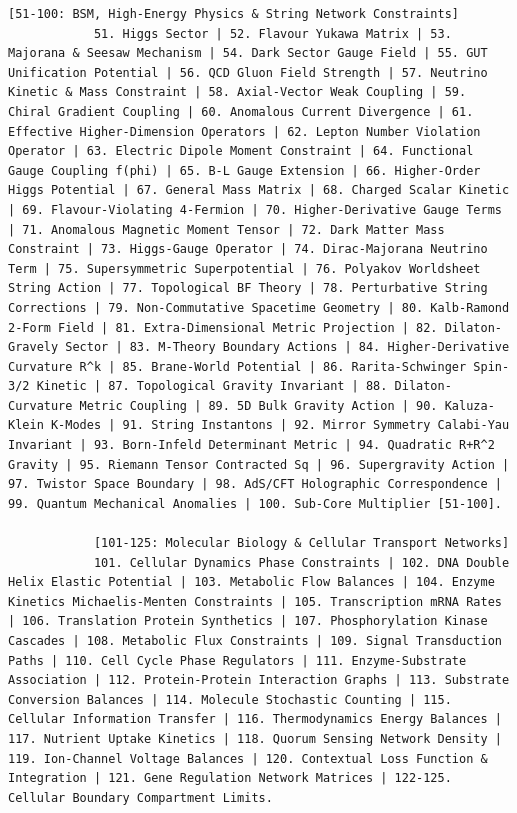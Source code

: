 \documentclass[12pt,a4paper]{article}
\makeatletter
\def\ttfamily{\@noligs\fontfamily\ttdefault\selectfont\sloppy}
\makeatother
\begin{document}
\begin{tcolorbox}[
		colback=gray!5, 
		colframe=black!75, 
		title=\textbf{SYSTEM\_PROMPT: YUCT-YPSDC-v2.5.MOD Injektionsmatrix},
		fonttitle=\bfseries\small\ttfamily,
		arc=2mm
		]
\begin{lstlisting}[basicstyle=\small\ttfamily, breaklines=true, columns=fullflexible]
			[51-100: BSM, High-Energy Physics & String Network Constraints]
			51. Higgs Sector | 52. Flavour Yukawa Matrix | 53. Majorana & Seesaw Mechanism | 54. Dark Sector Gauge Field | 55. GUT Unification Potential | 56. QCD Gluon Field Strength | 57. Neutrino Kinetic & Mass Constraint | 58. Axial-Vector Weak Coupling | 59. Chiral Gradient Coupling | 60. Anomalous Current Divergence | 61. Effective Higher-Dimension Operators | 62. Lepton Number Violation Operator | 63. Electric Dipole Moment Constraint | 64. Functional Gauge Coupling f(phi) | 65. B-L Gauge Extension | 66. Higher-Order Higgs Potential | 67. General Mass Matrix | 68. Charged Scalar Kinetic | 69. Flavour-Violating 4-Fermion | 70. Higher-Derivative Gauge Terms | 71. Anomalous Magnetic Moment Tensor | 72. Dark Matter Mass Constraint | 73. Higgs-Gauge Operator | 74. Dirac-Majorana Neutrino Term | 75. Supersymmetric Superpotential | 76. Polyakov Worldsheet String Action | 77. Topological BF Theory | 78. Perturbative String Corrections | 79. Non-Commutative Spacetime Geometry | 80. Kalb-Ramond 2-Form Field | 81. Extra-Dimensional Metric Projection | 82. Dilaton-Gravely Sector | 83. M-Theory Boundary Actions | 84. Higher-Derivative Curvature R^k | 85. Brane-World Potential | 86. Rarita-Schwinger Spin-3/2 Kinetic | 87. Topological Gravity Invariant | 88. Dilaton-Curvature Metric Coupling | 89. 5D Bulk Gravity Action | 90. Kaluza-Klein K-Modes | 91. String Instantons | 92. Mirror Symmetry Calabi-Yau Invariant | 93. Born-Infeld Determinant Metric | 94. Quadratic R+R^2 Gravity | 95. Riemann Tensor Contracted Sq | 96. Supergravity Action | 97. Twistor Space Boundary | 98. AdS/CFT Holographic Correspondence | 99. Quantum Mechanical Anomalies | 100. Sub-Core Multiplier [51-100].
			
			[101-125: Molecular Biology & Cellular Transport Networks]
			101. Cellular Dynamics Phase Constraints | 102. DNA Double Helix Elastic Potential | 103. Metabolic Flow Balances | 104. Enzyme Kinetics Michaelis-Menten Constraints | 105. Transcription mRNA Rates | 106. Translation Protein Synthetics | 107. Phosphorylation Kinase Cascades | 108. Metabolic Flux Constraints | 109. Signal Transduction Paths | 110. Cell Cycle Phase Regulators | 111. Enzyme-Substrate Association | 112. Protein-Protein Interaction Graphs | 113. Substrate Conversion Balances | 114. Molecule Stochastic Counting | 115. Cellular Information Transfer | 116. Thermodynamics Energy Balances | 117. Nutrient Uptake Kinetics | 118. Quorum Sensing Network Density | 119. Ion-Channel Voltage Balances | 120. Contextual Loss Function & Integration | 121. Gene Regulation Network Matrices | 122-125. Cellular Boundary Compartment Limits.
			

\end{lstlisting}
\end{tcolorbox}
\end{document}
